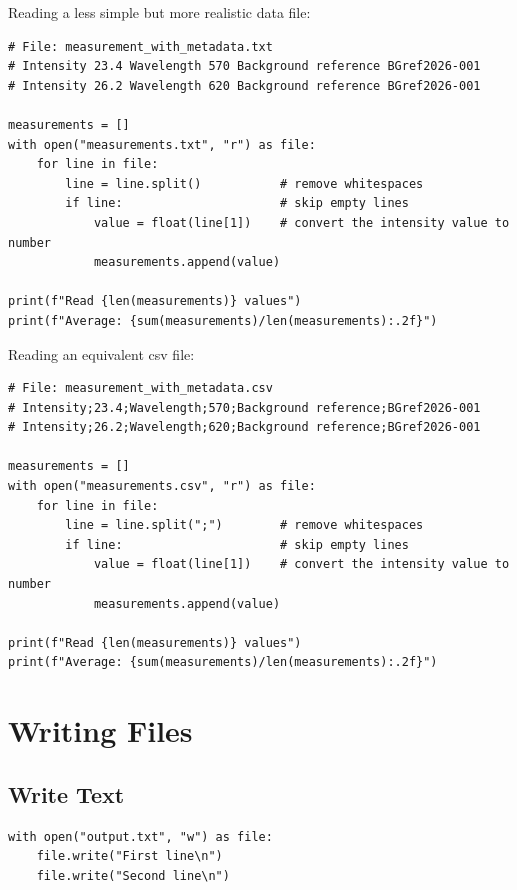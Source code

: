 \begin{labexample}
Reading a less simple but more realistic data file:

\begin{lstlisting}
# File: measurement_with_metadata.txt
# Intensity 23.4 Wavelength 570 Background reference BGref2026-001
# Intensity 26.2 Wavelength 620 Background reference BGref2026-001

measurements = []
with open("measurements.txt", "r") as file:
    for line in file:
        line = line.split()           # remove whitespaces
        if line:                      # skip empty lines
            value = float(line[1])    # convert the intensity value to number
            measurements.append(value)

print(f"Read {len(measurements)} values")
print(f"Average: {sum(measurements)/len(measurements):.2f}")
\end{lstlisting}

Reading an equivalent csv file:
\begin{lstlisting}
# File: measurement_with_metadata.csv
# Intensity;23.4;Wavelength;570;Background reference;BGref2026-001
# Intensity;26.2;Wavelength;620;Background reference;BGref2026-001

measurements = []
with open("measurements.csv", "r") as file:
    for line in file:
        line = line.split(";")        # remove whitespaces
        if line:                      # skip empty lines
            value = float(line[1])    # convert the intensity value to number
            measurements.append(value)

print(f"Read {len(measurements)} values")
print(f"Average: {sum(measurements)/len(measurements):.2f}")
\end{lstlisting}

\section{Writing Files}
\label{sec:writing-files}

\subsection{Write Text}

\begin{lstlisting}
with open("output.txt", "w") as file:
    file.write("First line\n")
    file.write("Second line\n")
\end{lstlisting}


\end{labexample}
